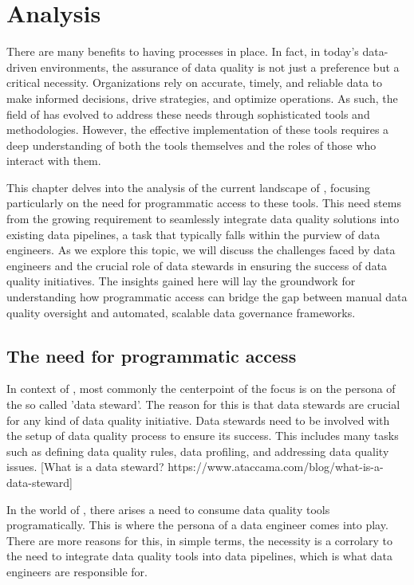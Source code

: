 \chapter{Analysis}
There are many benefits to having  processes in place. In fact, in today's data-driven environments, the assurance of data quality is not just a preference but a critical necessity. Organizations rely on accurate, timely, and reliable data to make informed decisions, drive strategies, and optimize operations. As such, the field of  has evolved to address these needs through sophisticated tools and methodologies. However, the effective implementation of these tools requires a deep understanding of both the tools themselves and the roles of those who interact with them.


This chapter delves into the analysis of the current landscape of , focusing particularly on the need for programmatic access to these tools. This need stems from the growing requirement to seamlessly integrate data quality solutions into existing data pipelines, a task that typically falls within the purview of data engineers. As we explore this topic, we will discuss the challenges faced by data engineers and the crucial role of data stewards in ensuring the success of data quality initiatives. The insights gained here will lay the groundwork for understanding how programmatic access can bridge the gap between manual data quality oversight and automated, scalable data governance frameworks.


\section{The need for programmatic access}

In context of , most commonly the centerpoint of the focus is on the persona of the so called 'data steward'. The reason for this is that data stewards are crucial
for any kind of data quality initiative. Data stewards need to be involved with the setup of data quality process to ensure its success. This includes many tasks such as defining data quality rules,
data profiling, and addressing data quality issues. [What is a data steward? https://www.ataccama.com/blog/what-is-a-data-steward]

In the world of , there arises a need to consume data quality tools programatically. This is where the persona of a data engineer comes into play. There are more reasons for this, in simple terms,
the necessity is a corrolary to the need to integrate data quality tools into data pipelines, which is what data engineers are responsible for.


